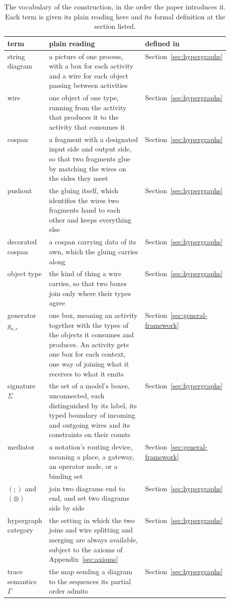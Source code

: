 \begin{table}[t]
  \centering
  \caption{The vocabulary of the construction, in the order the paper introduces it. Each term is
    given its plain reading here and its formal definition at the section listed.}
  \label{tab:intuition}
  \begin{tabular}{l p{0.52\linewidth} l}
    \hline
    term & plain reading & defined in \\
    \hline
    string diagram & a picture of one process, with a box for each activity and a wire for each
      object passing between activities & Section~\ref{sec:hypergraphs} \\
    wire & one object of one type, running from the activity that produces it to the activity that
      consumes it & Section~\ref{sec:hypergraphs} \\
    cospan & a fragment with a designated input side and output side, so that two fragments
      glue by matching the wires on the sides they meet & Section~\ref{sec:hypergraphs} \\
    pushout & the gluing itself, which identifies the wires two fragments hand to each other and
      keeps everything else & Section~\ref{sec:hypergraphs} \\
    decorated cospan & a cospan carrying data of its own, which the gluing carries along
      & Section~\ref{sec:hypergraphs} \\
    object type & the kind of thing a wire carries, so that two boxes join only where their types agree
      & Section~\ref{sec:hypergraphs} \\
    generator $g_{a,c}$ & one box, meaning an activity together with the types of the objects it
      consumes and produces. An activity gets one box for each context, one way of joining what it
      receives to what it emits &
      Section~\ref{sec:general-framework} \\
    signature $\Sigma$ & the set of a model's boxes, unconnected, each distinguished by its label, its typed
      boundary of incoming and outgoing wires and its constraints on their counts & Section~\ref{sec:hypergraphs} \\
    mediator & a notation's routing device, meaning a place, a gateway, an operator node, or a
      binding set & Section~\ref{sec:general-framework} \\
    $(;)$ and $(\otimes)$ & join two diagrams end to end, and set two diagrams side by side &
      Section~\ref{sec:hypergraphs} \\
    hypergraph category & the setting in which the two joins and wire splitting and merging are
      always available, subject to the axioms of Appendix~\ref{sec:axioms} &
      Section~\ref{sec:hypergraphs} \\
    trace semantics $\Gamma$ & the map sending a diagram to the sequences its partial order admits
      & Section~\ref{sec:hypergraphs} \\
    \hline
  \end{tabular}
\end{table}

